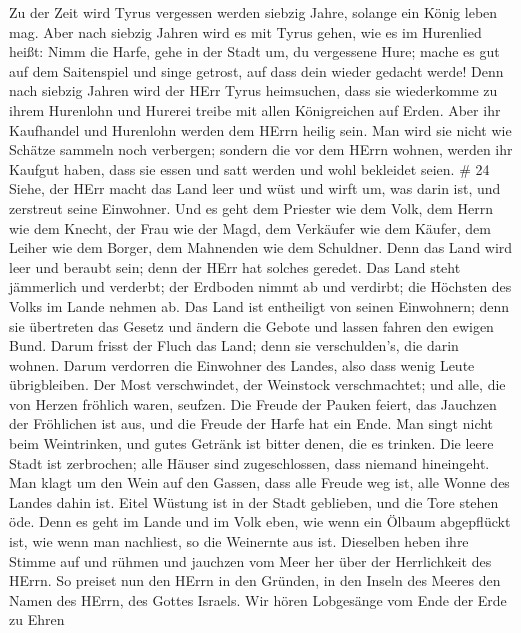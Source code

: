 Zu der Zeit wird Tyrus vergessen werden siebzig Jahre, solange ein König
leben mag. Aber nach siebzig Jahren wird es mit Tyrus gehen, wie es im
Hurenlied heißt:  Nimm die Harfe, gehe in der Stadt um, du
vergessene Hure; mache es gut auf dem Saitenspiel und singe getrost, auf
dass dein wieder gedacht werde!  Denn nach siebzig Jahren
wird der HErr Tyrus heimsuchen, dass sie wiederkomme zu ihrem Hurenlohn
und Hurerei treibe mit allen Königreichen auf Erden.  Aber
ihr Kaufhandel und Hurenlohn werden dem HErrn heilig sein. Man wird sie
nicht wie Schätze sammeln noch verbergen; sondern die vor dem HErrn
wohnen, werden ihr Kaufgut haben, dass sie essen und satt werden und
wohl bekleidet seien. \# 24  Siehe, der HErr macht das Land
leer und wüst und wirft um, was darin ist, und zerstreut seine
Einwohner.  Und es geht dem Priester wie dem Volk, dem Herrn
wie dem Knecht, der Frau wie der Magd, dem Verkäufer wie dem Käufer, dem
Leiher wie dem Borger, dem Mahnenden wie dem Schuldner. 
Denn das Land wird leer und beraubt sein; denn der HErr hat solches
geredet.  Das Land steht jämmerlich und verderbt; der
Erdboden nimmt ab und verdirbt; die Höchsten des Volks im Lande nehmen
ab.  Das Land ist entheiligt von seinen Einwohnern; denn sie
übertreten das Gesetz und ändern die Gebote und lassen fahren den ewigen
Bund.  Darum frisst der Fluch das Land; denn sie
verschulden's, die darin wohnen. Darum verdorren die Einwohner des
Landes, also dass wenig Leute übrigbleiben.  Der Most
verschwindet, der Weinstock verschmachtet; und alle, die von Herzen
fröhlich waren, seufzen.  Die Freude der Pauken feiert, das
Jauchzen der Fröhlichen ist aus, und die Freude der Harfe hat ein Ende.
 Man singt nicht beim Weintrinken, und gutes Getränk ist
bitter denen, die es trinken.  Die leere Stadt ist
zerbrochen; alle Häuser sind zugeschlossen, dass niemand hineingeht.
 Man klagt um den Wein auf den Gassen, dass alle Freude weg
ist, alle Wonne des Landes dahin ist.  Eitel Wüstung ist in
der Stadt geblieben, und die Tore stehen öde.  Denn es geht
im Lande und im Volk eben, wie wenn ein Ölbaum abgepflückt ist, wie wenn
man nachliest, so die Weinernte aus ist.  Dieselben heben
ihre Stimme auf und rühmen und jauchzen vom Meer her über der
Herrlichkeit des HErrn.  So preiset nun den HErrn in den
Gründen, in den Inseln des Meeres den Namen des HErrn, des Gottes
Israels.  Wir hören Lobgesänge vom Ende der Erde zu Ehren

